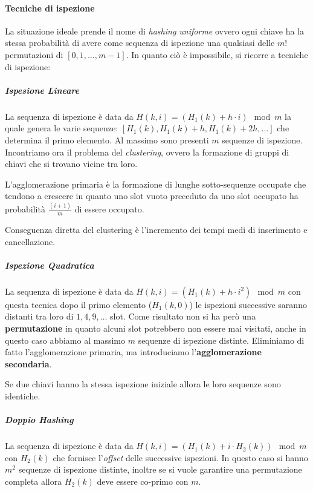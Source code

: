             \paragraph{Tecniche di ispezione} La situazione ideale prende il nome di \textit{hashing uniforme} ovvero ogni chiave ha la stessa probabilità di avere come sequenza di ispezione una qualsiasi delle $m!$ permutazioni di $[0, 1, \dots, m-1]$. In quanto ciò è impossibile, si ricorre a tecniche di ispezione:
                \subparagraph{Ispesione Lineare} La sequenza di ispezione è data da $H(k,i) = (H_1(k) + h\cdot i) \mod m$ la quale genera le varie sequenze: $[H_1(k), H_1(k)+h, H_1(k)+2h, \dots]$ che determina il primo elemento. Al massimo sono presenti $m$ sequenze di ispezione. Incontriamo ora il problema del \textit{clustering}, ovvero la formazione di gruppi di chiavi che si trovano vicine tra loro. \begin{definition}
                    L'agglomerazione primaria è la formazione di lunghe sotto-sequenze occupate che tendono a crescere in quanto uno slot vuoto preceduto da uno slot occupato ha probabilità $\frac{(i+1)}m$ di essere occupato. 
                \end{definition}
                Conseguenza diretta del clustering è l'incremento dei tempi medi di inserimento e cancellazione.
                \subparagraph{Ispezione Quadratica} La sequenza di ispezione è data da $H(k,i) = \left(H_1(k) + h \cdot i^2\right) \mod m$ con questa tecnica dopo il primo elemento ($H_1(k,0)$) le ispezioni successive saranno distanti tra loro di $1, 4, 9, \dots$ slot. Come risultato non si ha però una \textbf{permutazione} in quanto alcuni slot potrebbero non essere mai visitati, anche in questo caso abbiamo al massimo $m$ sequenze di ispezione distinte. Eliminiamo di fatto l'agglomerazione primaria, ma introduciamo l'\textbf{agglomerazione secondaria}.
                \begin{definition}
                    Se due chiavi hanno la stessa ispezione iniziale allora le loro sequenze sono identiche.
                \end{definition}
                \subparagraph{Doppio Hashing} La sequenza di ispezione è data da $H(k,i) = (H_1(k) + i\cdot H_2(k)) \mod m$ con $H_2(k)$ che fornisce l'\textit{offset} delle successive ispezioni. In questo caso si hanno $m^2$ sequenze di ispezione distinte, inoltre se si vuole garantire una permutazione completa allora $H_2(k)$ deve essere co-primo con $m$.
